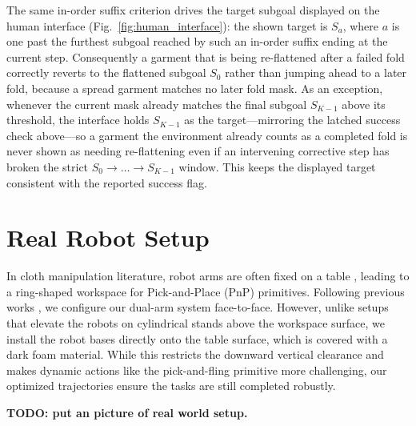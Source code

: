 \documentclass[journal]{IEEEtran}
\begin{document}
The same in-order suffix criterion drives the target subgoal displayed on the human interface
(Fig.~\ref{fig:human_interface}): the shown target is $S_{a}$, where $a$ is one past the furthest
subgoal reached by such an in-order suffix ending at the current step. Consequently a garment that is
being re-flattened after a failed fold correctly reverts to the flattened subgoal $S_0$ rather than
jumping ahead to a later fold, because a spread garment matches no later fold mask. As an exception,
whenever the current mask already matches the final subgoal $S_{K-1}$ above its threshold, the
interface holds $S_{K-1}$ as the target---mirroring the latched success check above---so a garment the
environment already counts as a completed fold is never shown as needing re-flattening even if an
intervening corrective step has broken the strict $S_0\!\to\!\dots\!\to\!S_{K-1}$ window. This keeps
the displayed target consistent with the reported success flag.

\section{Real Robot Setup} \label{sec:real-world-setup}

In cloth manipulation literature, robot arms are often fixed on a table \cite{lin2022learning,canberk2022cloth}, leading to a ring-shaped workspace for Pick-and-Place (PnP) primitives. Following previous works \cite{luo2025clothmate, canberk2022cloth}, we configure our dual-arm system face-to-face. However, unlike setups that elevate the robots on cylindrical stands above the workspace surface, we install the robot bases directly onto the table surface, which is covered with a dark foam material. While this restricts the downward vertical clearance and makes dynamic actions like the pick-and-fling primitive more challenging, our optimized trajectories ensure the tasks are still completed robustly.

\textbf{TODO: put an picture of real world setup.}
\end{document}
